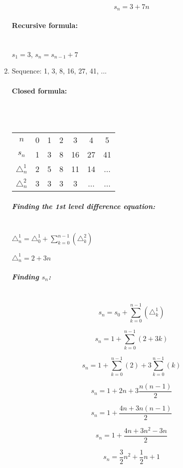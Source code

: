 \begin{enumerate}
                $$s_{n} = 3 + 7n $$

                \paragraph{Recursive formula:} ~\\
                $s_{1} = 3$, $s_{n} = s_{n-1} + 7$ ~\\        

        \newpage

        \item   Sequence: 1, 3, 8, 16, 27, 41, ...
                \paragraph{Closed formula:} ~\\~\\
                \begin{tabular}{c | c c c c c c}
                    $n$
                        & 0 & 1 & 2 & 3 & 4 & 5
                    \\
                    $s_{n}$
                        & 1 & 3 & 8 & 16 & 27 & 41
                    \\
                    $\triangle^{1}_{n}$
                        & 2 & 5 & 8 & 11 & 14 & ...

                    \\
                    $\triangle^{2}_{n}$
                        & 3 & 3 & 3 & 3 & ... & ...
                \end{tabular}

                \subparagraph{Finding the 1st level difference equation:} ~\\
                
                $ \triangle_{n}^{1} = \triangle_{0}^{1} + \sum_{k=0}^{n-1} ( \triangle_{k}^{2} ) $

                $ \triangle_{n}^{1} = 2 + 3n $
                
                \subparagraph{Finding $s_{n}$:} ~\\

                $$ s_{n} = s_{0} + \sum_{k=0}^{n-1} ( \triangle_{k}^{1} )$$
                
                $$ s_{n} = 1 + \sum_{k=0}^{n-1} ( 2 + 3k )$$
                
                $$ s_{n} = 1 + \sum_{k=0}^{n-1} ( 2 ) + 3  \sum_{k=0}^{n-1} ( k )$$
                
                $$ s_{n} = 1 + 2n + 3  \frac{n(n-1)}{2}$$
                
                $$ s_{n} = 1 + \frac{4n + 3n(n-1)}{2}$$
                
                $$ s_{n} = 1 + \frac{4n + 3n^{2} - 3n}{2}$$
                
                $$ s_{n} = \frac{3}{2} n^{2} + \frac{1}{2} n + 1 $$

                

                
        
    \end{enumerate}




